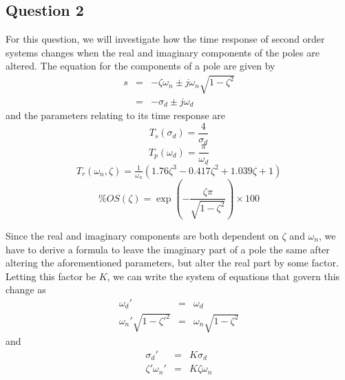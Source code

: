 \documentclass[a4paper, 12pt]{article}
\begin{document}
		\subsection{Question 2} %
		\label{sub:prelab_question_2}
			For this question, we will investigate how the time response of second order systems changes when the real and imaginary components of the poles are altered. The equation for the components of a pole are given by
			\begin{equation}
				\begin{array}{rcl}
					s & = & -\zeta\omega_n \pm j\omega_n\sqrt{1 - \zeta^2} \\
					& = & -\sigma_d \pm j\omega_d
				\end{array}
				\label{eq:pole_exp}
			\end{equation}
			and the parameters relating to its time response are
			\begin{equation}
				T_s(\sigma_d) = \frac{4}{\sigma_d}
				\label{eq:2nd_ts}
			\end{equation}
			\begin{equation}
				T_p(\omega_d) = \frac{\pi}{\omega_d}
				\label{eq:2nd_tp}
			\end{equation}
			\begin{equation}
				T_r(\omega_n, \zeta) = \tfrac{1}{\omega_n}(1.76\zeta^3 - 0.417\zeta^2 + 1.039 \zeta + 1)
				\label{eq:2nd_tr}
			\end{equation}
			\begin{equation}
				\%OS(\zeta) = \exp\left(-\frac{\zeta\pi}{\sqrt{1 - \zeta^2}}\right) \times 100
				\label{eq:2nd_os}
			\end{equation}

			Since the real and imaginary components are both dependent on $\zeta$ and $\omega_n$, we have to derive a formula to leave the imaginary part of a pole the same after altering the aforementioned parameters, but alter the real part by some factor. Letting this factor be $K$, we can write the system of equations that govern this change as
			\begin{equation}
				\begin{array}{rcl}
					\omega_d' & = & \omega_d \\
					\omega_n'\sqrt{1 - \zeta'^2} & = & \omega_n\sqrt{1 - \zeta^2}
				\end{array}
				\label{eq:der_1}
			\end{equation}
			and
			\begin{equation}
				\begin{array}{rcl}
					\sigma_d' & = & K\sigma_d \\
					\zeta'\omega_n' & = & K \zeta\omega_n
				\end{array}
				\label{eq:der_2}
			\end{equation}
\end{document}
